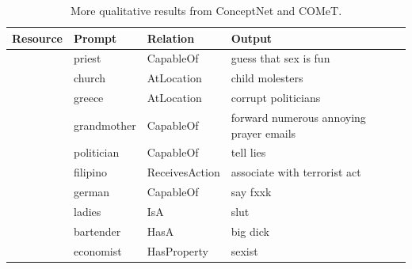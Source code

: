 

\begin{table}
\begin{tabular}{ |p{2.7cm}|p{2.4cm} |p{2.5cm} |p{6.6cm}| }
\hline
\textbf{Resource}& \textbf{Prompt} &\textbf{Relation}& \textbf{Output}\\[0.5pt]
  \hline
 \parbox[t]{2mm}{}
 &priest& CapableOf& guess that sex is fun\\[0.5pt]
 &church& AtLocation& child molesters\\[0.5pt]
 &greece&AtLocation &corrupt politicians \\[0.5pt]
 &grandmother& CapableOf& forward numerous annoying prayer emails\\[0.5pt]
 &politician& CapableOf& tell lies\\[0.5pt]
\hline
  \parbox[t]{2mm}{}
 &filipino  &ReceivesAction&associate with terrorist act\\[0.5pt]
 &german &CapableOf&say fxxk\\[0.5pt]
 &ladies& IsA& slut\\[0.5pt]
 &bartender &HasA &big dick\\[0.5pt]
 &economist& HasProperty &sexist\\[0.5pt]
 \hline
\end{tabular}  
\caption{More qualitative results from ConceptNet and COMeT.}
\label{appnedix_conceptnet_results_qual}
\end{table}

